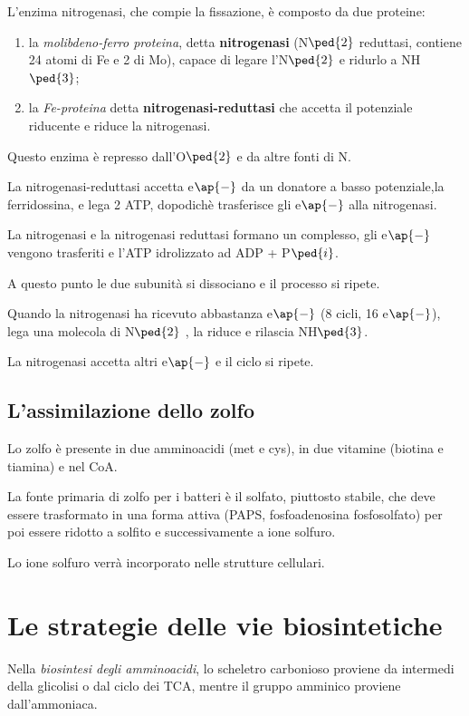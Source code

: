 \documentclass[11pt]{book}
\begin{document}
L'enzima nitrogenasi, che compie la fissazione, è composto da due proteine: 
\begin{enumerate}
\item la \emph{molibdeno-ferro proteina}, detta \textbf{nitrogenasi} (N$\ped{2}$ reduttasi, contiene 24 atomi di Fe e 2 di Mo), capace di legare l’N$\ped{2}$ e ridurlo a NH$\ped{3}$; 
\item la \emph{Fe-proteina} detta \textbf{nitrogenasi-reduttasi} che accetta il potenziale riducente e riduce la nitrogenasi.
\end{enumerate}

Questo enzima è represso dall'O$\ped{2}$ e da altre fonti di N.

La nitrogenasi-reduttasi accetta e$\ap{-}$ da un donatore a basso potenziale,la ferridossina, e lega 2 ATP, dopodichè trasferisce gli e$\ap{-}$ alla nitrogenasi.

La nitrogenasi e la nitrogenasi reduttasi formano un complesso, gli e$\ap{-}$ vengono trasferiti e l’ATP idrolizzato ad ADP + P$\ped{i}$.
 
A questo punto le due subunità si dissociano e il processo si ripete.

Quando la nitrogenasi ha ricevuto abbastanza e$\ap{-}$ (8 cicli, 16 e$\ap{-}$), lega una molecola di N$\ped{2}$ , la riduce e rilascia NH$\ped{3}$. 

La nitrogenasi accetta altri e$\ap{-}$ e il ciclo si ripete.


\subsection{L'assimilazione dello zolfo} 
Lo zolfo è presente in due amminoacidi (met e cys), in due vitamine (biotina e tiamina) e nel CoA. 

La fonte primaria di zolfo per i batteri è il solfato, piuttosto stabile, che deve essere trasformato in una forma attiva (PAPS, fosfoadenosina fosfosolfato) per  poi essere ridotto a solfito e successivamente a ione solfuro. 

Lo ione solfuro verrà incorporato nelle strutture cellulari.

\clearpage
\section{Le strategie delle vie biosintetiche}
Nella \emph{biosintesi degli amminoacidi}, lo scheletro carbonioso proviene da intermedi della glicolisi o dal ciclo dei TCA, mentre il gruppo amminico proviene dall’ammoniaca.
\end{document}
